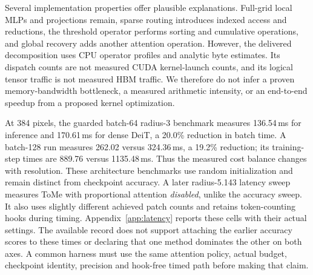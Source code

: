 Several implementation properties offer plausible explanations. Full-grid
local MLPs and projections remain, sparse routing introduces indexed access
and reductions, the threshold operator performs sorting and cumulative
operations, and global recovery adds another attention operation. However,
the delivered decomposition uses CPU operator profiles and analytic byte
estimates. Its dispatch counts are not measured CUDA kernel-launch counts,
and its logical tensor traffic is not measured HBM traffic. We therefore do
not infer a proven memory-bandwidth bottleneck, a measured arithmetic
intensity, or an end-to-end speedup from a proposed kernel optimization.

At 384 pixels, the guarded batch-64 radius-3 benchmark measures 136.54\,ms
for \mn{} inference and 170.61\,ms for dense DeiT, a 20.0\% reduction in
batch time. A batch-128 run measures 262.02 versus 324.36\,ms, a 19.2\%
reduction; its training-step times are 889.76 versus 1135.48\,ms. Thus the
measured cost balance changes with resolution. These architecture benchmarks
use random initialization and remain distinct from checkpoint accuracy. A
later radius-5.143 latency sweep measures ToMe with proportional attention
\emph{disabled}, unlike the accuracy sweep. It also uses slightly different
achieved patch counts and retains token-counting hooks during timing.
Appendix~\ref{app:latency} reports these cells with their actual settings.
The available record does not support attaching the earlier accuracy scores
to these times or declaring that one method dominates the other on both axes.
A common harness must use the same attention policy, actual budget, checkpoint
identity, precision and hook-free timed path before making that claim.


